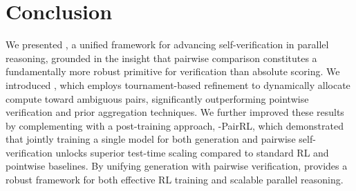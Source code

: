 \section{Conclusion}

We presented \method{}, a unified framework for advancing self-verification in parallel reasoning, grounded in the insight that pairwise comparison constitutes a fundamentally more robust primitive for verification than absolute scoring. We introduced \pairinfer{}, which employs tournament-based refinement to dynamically allocate compute toward ambiguous pairs, significantly outperforming pointwise verification and prior aggregation techniques.
We further improved these results by complementing \method{} with a post-training approach,
\method{}-PairRL, which demonstrated that jointly training a single model for both generation and pairwise self-verification unlocks superior test-time scaling compared to standard RL and pointwise baselines. By unifying generation with pairwise verification, \method{} provides a robust framework for both effective RL training and scalable parallel reasoning.
